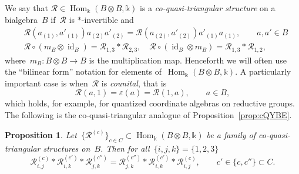 \documentclass[12pt, reqno]{amsart}
\newtheorem{proposition}[theorem]{Proposition}
\theoremstyle{definition}
\numberwithin{equation}{section}
\newcommand{\tensor}{\otimes}
\newcommand{\kk}{\mathbb{k}}\newcommand{\lie}[1]{{\mathfrak{#1}}}
\DeclareMathOperator{\id}{id}
\DeclareMathOperator{\Hom}{Hom}
\begin{document}
We say that
$\mathcal R\in\Hom_\kk(B\tensor B,\kk)$ is a 
{\em co-quasi-triangular structure} on a bialgebra~$B$
if~$\mathcal R$ is $\ast$-invertible
and
\begin{align}
&\mathcal R(a_{(1)},a'_{(1)})a_{(2)}a'_{(2)}=\mathcal R(a_{(2)},a'_{(2)})a'_{(1)}a_{(1)},\qquad a,a'\in B
\label{eq:coquas triang 1}\\
&\mathcal R\circ (m_B\tensor\id_B)=\mathcal R_{1,3}\ast \mathcal R_{2,3},\quad  
\mathcal R\circ (\id_B\tensor m_B)=\mathcal R_{1,3}\ast \mathcal R_{1,2},\label{eq:coquas triang 2}
\end{align}
where~$m_B:B\tensor B\to B$ is the multiplication map. Henceforth we will often use the ``bilinear form'' notation for elements of~$\Hom_\kk(B\tensor B,\kk)$.
A particularly important case is when~$\mathcal R$
is {\em counital}, that is
\begin{equation}\label{eq:counital}
\mathcal R(a,1)=\varepsilon(a)=\mathcal R(1,a),\qquad a\in B,
\end{equation}
which holds, for example, for quantized coordinate algebras on
reductive groups. 
The following is the co-quasi-triangular 
analogue of Proposition~\ref{prop:cQYBE}. 
\begin{proposition}\label{prop:dual cQYBE}
Let~$\{\mathcal R^{(c)}\}_{c\in C}\subset \Hom_\kk(B\tensor B,\kk)$ be a family 
of co-quasi-triangular structures on~$B$.
Then for all~$\{i,j,k\}=\{1,2,3\}$
\begin{equation}\label{eq:coquas cQYBE}
\mathcal R_{i,j}^{(c)}\ast \mathcal R_{i,k}^{(c')}
\ast \mathcal R_{j,k}^{(c'')}=\mathcal R_{j,k}^{(c'')}
\ast \mathcal R_{i,k}^{(c')}\ast \mathcal R_{i,j}^{(c)},\qquad 
c'\in \{c,c''\}\subset C.
\end{equation}
\end{proposition}
\end{document}
